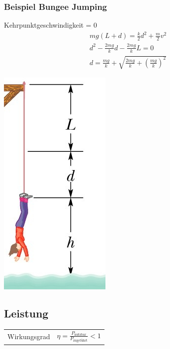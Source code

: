 \documentclass[a4paper]{scrartcl}
\begin{document}
\subsubsection{Beispiel Bungee Jumping}
	\begin{multicols}{2}
		Kehrpunktgeschwindigkeit = 0
		\begin{align*}
			mg(L + d) = \frac{k}{2} d^2 + \frac{m}{2} v^2\\
			d^2 - \frac{2mg}{k}d - \frac{2mg}{k}L = 0\\
			d = \frac{mg}{k} + \sqrt{\frac{2mg}{k} + \left(\frac{mg}{k}\right)^2}
		\end{align*}
		

		
		\includegraphics[width=0.25\linewidth]{img/bungee}
	\end{multicols}

\subsection{Leistung}
	\begin{tabu}{l X}
		Wirkungsgrad & $\eta = \frac{P_\text{nutzbar}}{P_\text{zugeführt}} < 1$
	\end{tabu}
\end{document}
